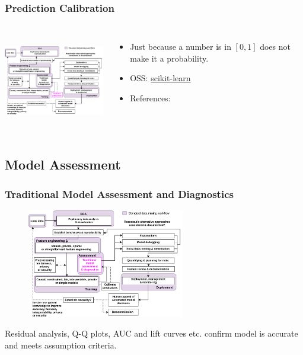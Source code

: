 \documentclass[11pt,
               aspectratio=169,
               hyperref={colorlinks}
               ]{beamer}
\begin{document}
			\begin{frame}
		
				\frametitle{Prediction Calibration}		
			
				\begin{columns}
	
					\centering
					\includegraphics[height=120pt]{../img/calibrate.png}
				
					\begin{itemize}
						\item Just because a number is in $[0,1]$ does not make it a probability. 
						\item OSS: \href{https://scikit-learn.org/stable/modules/calibration.html}{scikit-learn} 
						\item References: 
					\end{itemize}
				
				\end{columns}			

			\end{frame}

		\subsection{Model Assessment}

			\begin{frame}
		
				\frametitle{Traditional Model Assessment and Diagnostics}		
			
				\begin{figure}[htb]
					\begin{center}
						\includegraphics[height=135pt]{../img/ma.png}
					\end{center}
				\end{figure}	

			\vspace{-10pt}
			\scriptsize{Residual analysis, Q-Q plots, AUC and lift curves etc. confirm model is accurate and meets assumption criteria.}
		
			\end{frame}
\end{document}
